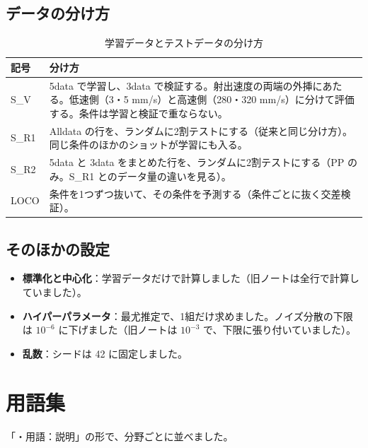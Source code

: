 \documentclass[paper=a4paper,fontsize=10.5pt,line_length=44zw,number_of_lines=38]{jlreq}
\newenvironment{points}{\begin{itemize}[label=$\triangleright$,leftmargin=1.5\zw,itemsep=0.3ex,topsep=0.5ex,parsep=0pt]}{\end{itemize}}
\newcommand{\pt}[1]{\item \textbf{#1}：}
\begin{document}
\subsection{データの分け方}
\begin{table}[H]
\caption{学習データとテストデータの分け方}
\begin{tabularx}{\linewidth}{@{}lX@{}}
\toprule
記号 & 分け方 \\
\midrule
S\_V & 5data で学習し、3data で検証する。射出速度の両端の外挿にあたる。低速側（3・5 mm/s）と高速側（280・320 mm/s）に分けて評価する。条件は学習と検証で重ならない。 \\
S\_R1 & Alldata の行を、ランダムに2割テストにする（従来と同じ分け方）。同じ条件のほかのショットが学習にも入る。 \\
S\_R2 & 5data と 3data をまとめた行を、ランダムに2割テストにする（PP のみ。S\_R1 とのデータ量の違いを見る）。 \\
LOCO & 条件を1つずつ抜いて、その条件を予測する（条件ごとに抜く交差検証）。 \\
\bottomrule
\end{tabularx}
\end{table}

\subsection{そのほかの設定}
\begin{points}
\pt{標準化と中心化}学習データだけで計算しました（旧ノートは全行で計算していました）。
\pt{ハイパーパラメータ}最尤推定で、1組だけ求めました。ノイズ分散の下限は $10^{-6}$ に下げました（旧ノートは $10^{-3}$ で、下限に張り付いていました）。
\pt{乱数}シードは 42 に固定しました。
\end{points}

\section{用語集}

「・用語：説明」の形で、分野ごとに並べました。
\end{document}
